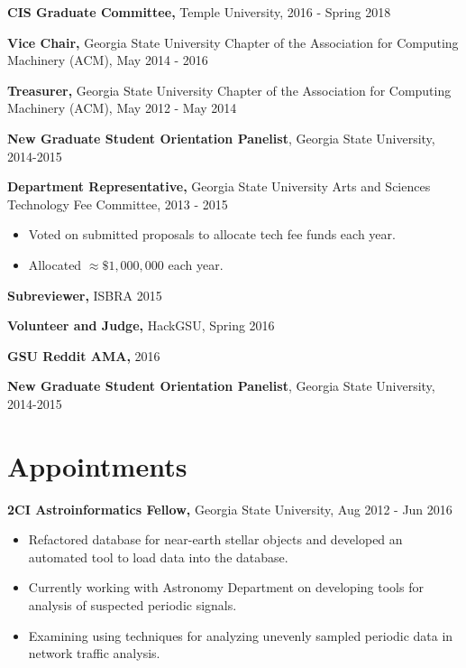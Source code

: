 \documentclass{res}
\begin{document}
\begin{resume}
\textbf{CIS Graduate Committee,} Temple University, 2016 - Spring 2018

{\bf Vice Chair,} Georgia State University Chapter of the Association for Computing Machinery (ACM),  May 2014 - 2016

{\bf Treasurer,} Georgia State University Chapter of the Association for Computing Machinery (ACM), May 2012 - May 2014

{\bf New Graduate Student Orientation Panelist}, Georgia State University, 2014-2015


{\bf Department Representative,} Georgia State University Arts and Sciences Technology Fee Committee, 2013 - 2015
\begin{itemize}
	\item Voted on submitted proposals to allocate tech fee funds each year.
	\item Allocated $\approx \$1,000,000$ each year.
\end{itemize}

{\bf Subreviewer,} ISBRA 2015

{\bf Volunteer and Judge,} HackGSU, Spring 2016

{\bf GSU Reddit AMA,} 2016



{\bf New Graduate Student Orientation Panelist}, Georgia State University, 2014-2015



\section{Appointments}

{\bf 2CI Astroinformatics Fellow,} Georgia State University, Aug 2012 - Jun 2016
     \begin{itemize}
     \item Refactored database for near-earth stellar objects and developed an automated tool to load data into the database.
     \item Currently working with Astronomy Department on developing tools for analysis of suspected periodic signals.
     \item Examining using techniques for analyzing unevenly sampled periodic data in network traffic analysis.
     \end{itemize}   



\end{resume}
\end{document}
